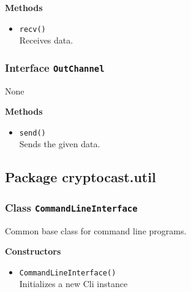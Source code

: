 \textbf{Methods}
\begin{itemize}
\item \lstinline|recv()| \\
Receives data.

\end{itemize}

\subsubsection{Interface \lstinline|OutChannel|}
None


\textbf{Methods}
\begin{itemize}
\item \lstinline|send()| \\
Sends the given data.

\end{itemize}


\subsection{Package cryptocast.util}
\subsubsection{Class \lstinline|CommandLineInterface|}
Common base class for command line programs.

\textbf{Constructors}
\begin{itemize}
\item \lstinline|CommandLineInterface()| \\
Initializes a new Cli instance

\end{itemize}

